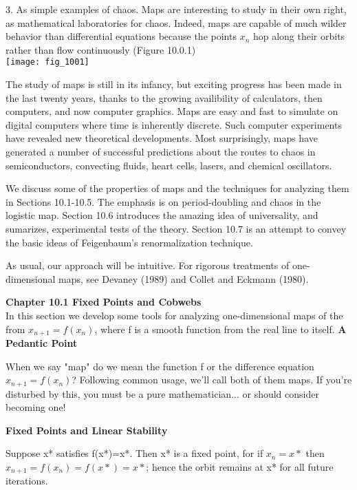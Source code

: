 \documentclass{article}
\newcommand\tab[1][1cm]{\hspace*{#1}}
\begin{document}
3. As simple examples of chaos. Maps are interesting to study in their own right, as mathematical laboratories for chaos. Indeed, maps are capable of much wilder behavior than differential equations because the points $x_{n}$ hop along their orbits rather than flow continuously (Figure 10.0.1) \\

\texttt{[image: fig\_1001]} 

\tab The study of maps is still in its infancy, but exciting progress has been made in the last twenty years, thanks to the growing availibility of calculators, then computers, and now computer graphics. Maps are easy and fast to simulate on digital computers where time is inherently discrete. Such computer experiments have revealed new theoretical developments. Most surprisingly, maps have generated a number of successful predictions about the routes to chaos in semiconductors, convecting fluids, heart cells, lasers, and chemical oscillators. \\ \tab

We discuss some of the properties of maps and the techniques for analyzing them in Sections 10.1-10.5. The emphasis is on period-doubling and chaos in the logistic map. Section 10.6 introduces the amazing idea of universality, and sumarizes, experimental tests of the theory. Section 10.7 is an attempt to convey the basic ideas of Feigenbaum's renormalization technique. \\ \tab

As usual, our approach will be intuitive. For rigorous treatments of one-dimensional maps, see Devaney (1989) and Collet and Eckmann (1980). 

\textbf {Chapter 10.1 Fixed Points and Cobwebs} \\
In this section we develop some tools for analyzing one-dimensional maps of the from $x_{n+1}=f(x_{n})$, where f is a smooth function from the real line to itself. 
\textbf {A Pedantic Point} \\ \tab

When we say "map" do we mean the function f or the difference equation $x_{n+1}=f(x_{n})$? Following common usage, we'll call both of them maps. If you're disturbed by this, you must be a pure mathematician... or should consider becoming one! 

\textbf {Fixed Points and Linear Stability} \\ \tab

Suppose x* satisfies f(x*)=x*. Then x* is a fixed point, for if $x_{n}=x*$ then $x_{n+1}=f(x_{n})=f(x*)=x*$; hence the orbit remains at x* for all future iterations. \\ \tab
\end{document}
